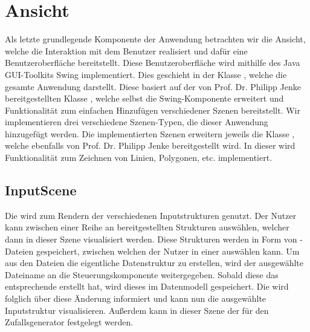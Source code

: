 \section{Ansicht}
Als letzte grundlegende Komponente der Anwendung betrachten wir die Ansicht, welche die Interaktion mit dem Benutzer realisiert und
dafür eine Benutzeroberfläche bereitstellt. Diese Benutzeroberfläche wird mithilfe des Java GUI-Toolkits Swing implementiert. Dies geschieht
in der Klasse , welche die gesamte Anwendung darstellt. Diese basiert auf der von Prof. Dr. Philipp Jenke
bereitgestellten Klasse , welche selbst die Swing-Komponente  erweitert und
Funktionalität zum einfachen Hinzufügen verschiedener Szenen bereitstellt. Wir implementieren drei verschiedene Szenen-Typen,
die dieser Anwendung hinzugefügt werden. Die implementierten Szenen erweitern jeweils die Klasse , welche ebenfalls
von Prof. Dr. Philipp Jenke bereitgestellt wird. In dieser wird Funktionalität zum Zeichnen von Linien, Polygonen, etc. implementiert.

\subsection{InputScene}
Die  wird zum Rendern der verschiedenen Inputstrukturen genutzt. Der Nutzer kann zwischen
einer Reihe an bereitgestellten Strukturen auswählen, welcher dann in dieser Szene visualisiert werden. Diese Strukturen werden
in Form von -Dateien gespeichert, zwischen welchen der Nutzer in einer  auswählen kann. Um aus den
Dateien die eigentliche Datenstruktur zu erstellen, wird der ausgewählte Dateiname an die Steuerungskomponente weitergegeben.
Sobald diese das entsprechende  erstellt hat, wird dieses im Datenmodell gespeichert. Die 
wird folglich über diese Änderung informiert und kann nun die ausgewählte Inputstruktur visualisieren.
Außerdem kann in dieser Szene der  für den Zufallsgenerator festgelegt werden.

